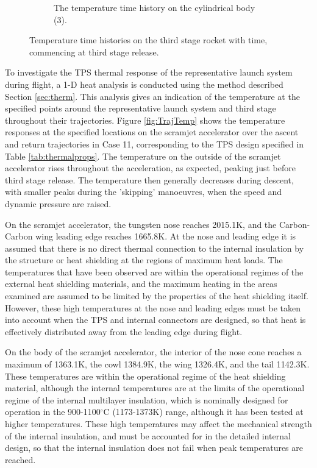 \begin{figure}[ht]
\begin{subfigure}{.495\textwidth}
		\caption{The temperature time history on the cylindrical body (\textcolor{black}{3}).}
	\end{subfigure}
	\caption{Temperature time histories on the third stage rocket with time, commencing at third stage release. }
	\label{fig:TrajTemp3}
\end{figure}
\noindent
To investigate the TPS thermal response of the representative launch system during flight, a 1-D heat analysis is conducted using the method described Section \ref{sec:therm}.
This analysis gives an indication of the temperature at the specified points around the representative launch system and third stage throughout their trajectories. 
Figure \ref{fig:TrajTemp} shows the temperature responses at the specified locations on the scramjet accelerator over the ascent and return trajectories in Case 11, corresponding to the TPS design specified in Table \ref{tab:thermalprops}. The temperature on the outside of the scramjet accelerator rises throughout the acceleration, as expected, peaking just before third stage release. The temperature then generally decreases during descent, with smaller peaks during the 'skipping' manoeuvres, when the speed and dynamic pressure are raised.

On the scramjet accelerator, the tungsten nose reaches 2015.1K, and the Carbon-Carbon wing leading edge reaches 1665.8K. 
At the nose and leading edge it is assumed that there is no direct thermal connection to the internal insulation by the structure or heat shielding at the regions of maximum heat loads. The temperatures that have been observed are within the operational regimes of the external heat shielding materials\cite{Fitzer,Leonhardt}, and the maximum heating in the areas examined are assumed to be limited by the properties of the heat shielding itself. However, these high temperatures at the nose and leading edges must be taken into account when the TPS and internal connectors are designed, so that heat is effectively distributed away from the leading edge during flight. 

On the body of the scramjet accelerator, the interior of the nose cone reaches a maximum of 1363.1K, the cowl 1384.9K, the wing 1326.4K, and the tail 1142.3K.
These temperatures are within the operational regime of the heat shielding material, although the internal temperatures are at the limits of the operational regime of the internal multilayer insulation, which is nominally designed for operation in the 900-1100$^\circ$C (1173-1373K) range, although it has been tested at higher temperatures\cite{Kourtides}. These high temperatures may affect the mechanical strength of the internal insulation\cite{Kourtides}, and must be accounted for in the detailed internal design, so that the internal insulation does not fail when peak temperatures are reached. 

